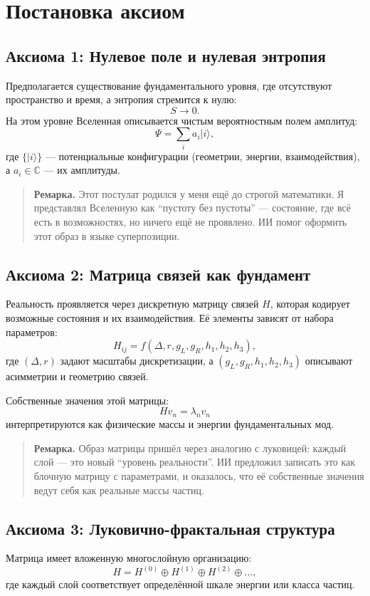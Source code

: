 \section{Постановка аксиом}

\subsection{Аксиома 1: Нулевое поле и нулевая энтропия}
Предполагается существование фундаментального уровня, где отсутствуют пространство и время, 
а энтропия стремится к нулю:
\[
S \to 0.
\]
На этом уровне Вселенная описывается чистым вероятностным полем амплитуд:
\[
\Psi = \sum_{i} a_i |i\rangle , 
\]
где $\{|i\rangle\}$ — потенциальные конфигурации (геометрии, энергии, взаимодействия), 
а $a_i \in \mathbb{C}$ — их амплитуды.

\begin{quote}\textbf{Ремарка.}  
Этот постулат родился у меня ещё до строгой математики. 
Я представлял Вселенную как ``пустоту без пустоты'' — состояние, где всё есть в возможностях, 
но ничего ещё не проявлено.  
ИИ помог оформить этот образ в языке суперпозиции.
\end{quote}

\subsection{Аксиома 2: Матрица связей как фундамент}
Реальность проявляется через дискретную матрицу связей $H$, 
которая кодирует возможные состояния и их взаимодействия.  
Её элементы зависят от набора параметров:
\[
H_{ij} = f(\Delta, r, g_L, g_R, h_1,h_2,h_3),
\]
где $(\Delta, r)$ задают масштабы дискретизации, 
а $(g_L,g_R,h_1,h_2,h_3)$ описывают асимметрии и геометрию связей.

Собственные значения этой матрицы:
\[
H v_n = \lambda_n v_n
\]
интерпретируются как физические массы и энергии фундаментальных мод.

\begin{quote}\textbf{Ремарка.}  
Образ матрицы пришёл через аналогию с луковицей:  
каждый слой — это новый ``уровень реальности''.  
ИИ предложил записать это как блочную матрицу с параметрами, 
и оказалось, что её собственные значения ведут себя как реальные массы частиц.
\end{quote}

\subsection{Аксиома 3: Луковично-фрактальная структура}
Матрица имеет вложенную многослойную организацию:
\[
H = H^{(0)} \oplus H^{(1)} \oplus H^{(2)} \oplus \dots,
\]
где каждый слой соответствует определённой шкале энергии или класса частиц.

